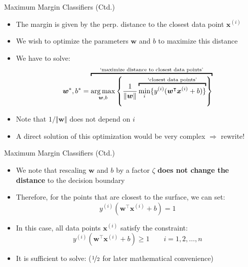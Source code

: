 \begin{frame}{Maximum Margin Classifiers (Ctd.)}{}
	\begin{itemize}
		\item The margin is given by the perp. distance to the closest data point $\bm{x}^{(i)}$
		\item We wish to optimize the parameters $\bm{w}$ and $b$ to maximize this distance
		\item We have to solve:
		\vspace*{-3.5mm}
		\begin{equation}
			\bm{w}^*, b^* =
			\overbracket{
				\argmax_{\bm{w}, b} \left\{ \frac{1}{\Vert \bm{w} \Vert}
				\overbracket{
					\min_i \{y^{(i)} (\bm{w}^{\intercal} \bm{x}^{(i)} + b)\}
				}^{\text{`closest data points'}}
				\right\}
			}^{\text{`maximize distance to closest data points'}}
		\end{equation}
		\vspace*{-3.5mm}
		\item Note that $1/\Vert \bm{w} \Vert$ does not depend on $i$
		\item A direct solution of this optimization would be very complex $\Rightarrow$ rewrite!
	\end{itemize}
\end{frame}


\begin{frame}{Maximum Margin Classifiers (Ctd.)}{}
	\begin{itemize}
		\item We note that rescaling $\bm{w}$ and $b$ by a factor $\zeta$
			\textbf{does not change the distance} to the decision boundary
		\item Therefore, for the points that are closest to the surface, we can set:
		\begin{equation}
			y^{(i)} (\bm{w}^{\intercal} \bm{x}^{(i)} + b) = 1
		\end{equation}
		\item In this case, all data points $\bm{x}^{(i)}$ satisfy the constraint:
		\begin{equation}
			y^{(i)} (\bm{w}^{\intercal} \bm{x}^{(i)} + b) \ge 1 \qquad i = 1, 2, \dots, n
		\end{equation}
		\item It is sufficient to solve: 
			\footnotesize ($\nicefrac{1}{2}$ for later mathematical convenience) \normalsize
	\end{itemize}
\end{frame}


